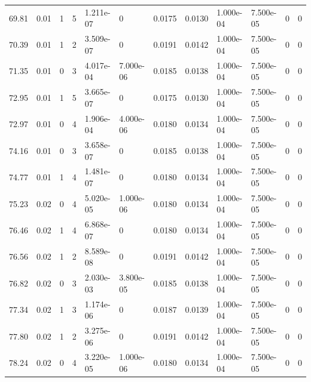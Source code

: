 \documentclass[preview]{standalone}
\begin{document}
{{{{\begin{tabular}{L{1.2cm}C{1.2cm} C{0.3cm}C{0.5cm} C{1.4cm}C{1.4cm} C{1.4cm}C{1.4cm} C{1.6cm}C{1.6cm} C{1.6cm}C{1.6cm}}
  69.81  &  0.01  & 1     &  5 &  1.211e-07  & 0  &  0.0175&   0.0130& 1.000e-04 & 7.500e-05   &  0 & 0  \\ 
  70.39  &  0.01  & 1     &  2 &  3.509e-07  & 0  &  0.0191&   0.0142& 1.000e-04 & 7.500e-05   &  0 & 0  \\ 
  71.35  &  0.01  & 0     &  3 &  4.017e-04  & 7.000e-06  &  0.0185&   0.0138& 1.000e-04 & 7.500e-05   &  0 & 0  \\ 
  72.95  &  0.01  & 1     &  5 &  3.665e-07  & 0  &  0.0175&   0.0130& 1.000e-04 & 7.500e-05   &  0 & 0  \\ 
  72.97  &  0.01  & 0     &  4 &  1.906e-04  & 4.000e-06  &  0.0180&   0.0134& 1.000e-04 & 7.500e-05   &  0 & 0  \\ 
  74.16  &  0.01  & 0     &  3 &  3.658e-07  & 0  &  0.0185&   0.0138& 1.000e-04 & 7.500e-05   &  0 & 0  \\ 
  74.77  &  0.01  & 1     &  4 &  1.481e-07  & 0  &  0.0180&   0.0134& 1.000e-04 & 7.500e-05   &  0 & 0  \\ 
  75.23  &  0.02  & 0     &  4 &  5.020e-05  & 1.000e-06  &  0.0180&   0.0134& 1.000e-04 & 7.500e-05   &  0 & 0  \\ 
  76.46  &  0.02  & 1     &  4 &  6.868e-07  & 0  &  0.0180&   0.0134& 1.000e-04 & 7.500e-05   &  0 & 0  \\ 
  76.56  &  0.02  & 1     &  2 &  8.589e-08  & 0  &  0.0191&   0.0142& 1.000e-04 & 7.500e-05   &  0 & 0  \\ 
  76.82  &  0.02  & 0     &  3 &  2.030e-03  & 3.800e-05  &  0.0185&   0.0138& 1.000e-04 & 7.500e-05   &  0 & 0  \\ 
  77.34  &  0.02  & 1     &  3 &  1.174e-06  & 0  &  0.0187&   0.0139& 1.000e-04 & 7.500e-05   &  0 & 0  \\ 
  77.80  &  0.02  & 1     &  2 &  3.275e-06  & 0  &  0.0191&   0.0142& 1.000e-04 & 7.500e-05   &  0 & 0  \\ 
  78.24  &  0.02  & 0     &  4 &  3.220e-05  & 1.000e-06  &  0.0180&   0.0134& 1.000e-04 & 7.500e-05   &  0 & 0  \\ 
\hline 
\end{tabular} 

}}}}
\end{document}
